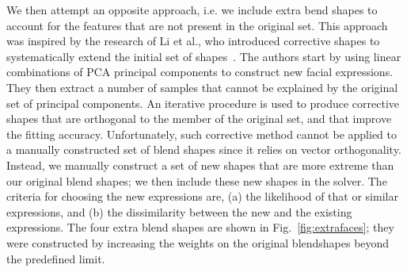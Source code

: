 \documentclass[11pt]{report}
\begin{document}
We then attempt an opposite approach, i.e. we include extra bend shapes to account for the features that are not present in the original set. This approach was inspired by the research of Li et al., who introduced corrective shapes to systematically extend the initial set of shapes~\cite{Li:2013}. The authors start by using linear combinations of PCA principal components to construct new facial expressions. They then extract a number of samples that cannot be explained by the original set of principal components. An iterative procedure is used to produce corrective shapes that are orthogonal to the member of the original set, and that improve the fitting accuracy. Unfortunately, such corrective method cannot be applied to a manually constructed set of blend shapes since it relies on vector orthogonality. Instead, we manually construct a set of new shapes that are more extreme than our original blend shapes; we then include these new shapes in the solver. The criteria for choosing the new expressions are, (a) the likelihood of that or similar expressions, and (b) the dissimilarity between the new and the existing expressions. The four extra blend shapes are shown in Fig.~\ref{fig:extrafaces}; they were constructed by increasing the weights on the original blendshapes beyond the predefined limit. 
\end{document}
